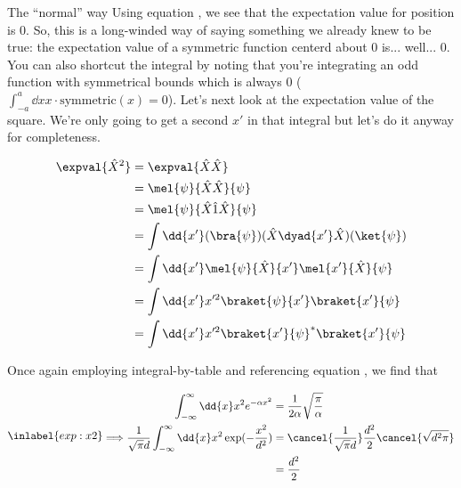 \begin{answer}
\begin{answerpart}{The ``normal'' way}
    Using equation , we see that the
    expectation value for position is $0$.  So, this is a long-winded
    way of saying something we already knew to be true: the
    expectation value of a symmetric function centerd about $0$
    is... well... $0$.  You can also shortcut the integral by noting
    that you're integrating an odd function with symmetrical bounds
    which is always $0$ ($\int_{-a}^a \dd{x} x \cdot \text{symmetric}(x) =
    0$).  Let's next look at the expectation value of the square.
    We're only going to get a second $x'$ in that integral but let's
    do it anyway for completeness.

    \begin{equation}
      \begin{split}
        \expval{\hat{X}^2}
        &= \expval{\hat{X}\hat{X}}\\
        &= \mel{\psi}{\hat{X}\hat{X}}{\psi}\\
        &= \mel{\psi}{\hat{X}\hat{1}\hat{X}}{\psi}\\
        &= \int \dd{x'} (\bra{\psi})(\hat{X}\dyad{x'}\hat{X})(\ket{\psi})\\
        &= \int \dd{x'} \mel{\psi}{\hat{X}}{x'}\mel{x'}{\hat{X}}{\psi}\\
        &= \int \dd{x'} x'^2\braket{\psi}{x'}\braket{x'}{\psi}\\
        &= \int \dd{x'} x'^2\braket{x'}{\psi}^{*}\braket{x'}{\psi}\\
      \end{split}
    \end{equation}

    Once again employing integral-by-table and referencing equation
    , we find that

    \begin{equation}
      \inlabel{exp:x2}
      \begin{alignedat}{2}
        & &
        \int_{-\infty}^{\infty} \dd{x} x^2e^{-\alpha x^2}
        &= \frac{1}{2\alpha}\sqrt{\frac{\pi}{\alpha}}\\
        \implies & &
        \frac{1}{\sqrt{\pi}d}
        \int_{-\infty}^{\infty} \dd{x} x^2\exp(-\frac{x^2}{d^2})
        &= \cancel{\frac{1}{\sqrt{\pi}d}}\frac{d^2}{2}\cancel{\sqrt{d^2\pi}}\\
        &&&= \frac{d^2}{2}\\
      \end{alignedat}
    \end{equation}


\end{answerpart}
\end{answer}
